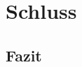 \documentclass[12pt]{article}
\begin{document}
    \newpage

    \section{}
    \subsection{}
    \subsection{}

    \newpage

    \section{Schluss}
    \subsection{Fazit}
\end{document}
